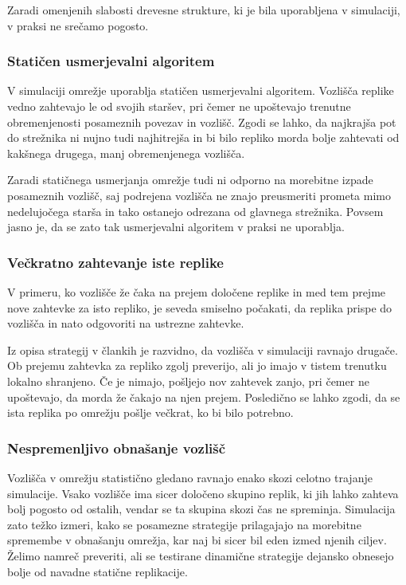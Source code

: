 \documentclass[a4paper, 12pt]{book}
\begin{document}
Zaradi omenjenih slabosti drevesne strukture, ki je bila uporabljena v
simulaciji, v praksi ne srečamo pogosto.

\subsubsection{Statičen usmerjevalni algoritem}

V simulaciji omrežje uporablja statičen usmerjevalni algoritem. Vozlišča
replike vedno zahtevajo le od svojih staršev, pri čemer ne upoštevajo trenutne
obremenjenosti posameznih povezav in vozlišč. Zgodi se lahko, da
najkrajša pot do strežnika ni nujno tudi najhitrejša in bi bilo repliko morda
bolje zahtevati od kakšnega drugega, manj obremenjenega vozlišča.

Zaradi statičnega usmerjanja omrežje tudi ni odporno na morebitne izpade
posameznih vozlišč, saj podrejena vozlišča ne znajo preusmeriti prometa mimo
nedelujočega starša in tako ostanejo odrezana od glavnega strežnika. Povsem
jasno je, da se zato tak usmerjevalni algoritem v praksi ne uporablja.

\subsubsection{Večkratno zahtevanje iste replike}

V primeru, ko vozlišče že čaka na prejem določene replike in med tem prejme
nove zahtevke za isto repliko, je seveda smiselno počakati, da replika prispe
do vozlišča in nato odgovoriti na ustrezne zahtevke.

Iz opisa strategij v člankih je razvidno, da vozlišča v simulaciji ravnajo
drugače. Ob prejemu zahtevka za repliko zgolj preverijo, ali jo imajo v tistem
trenutku lokalno shranjeno. Če je nimajo, pošljejo nov zahtevek zanjo, pri
čemer ne upoštevajo, da morda že čakajo na njen prejem. Posledično se lahko
zgodi, da se ista replika po omrežju pošlje večkrat, ko bi bilo potrebno.

\subsubsection{Nespremenljivo obnašanje vozlišč}

Vozlišča v omrežju statistično gledano ravnajo enako skozi celotno trajanje
simulacije. Vsako vozlišče ima sicer določeno skupino replik, ki jih
lahko zahteva bolj pogosto od ostalih, vendar se ta skupina skozi čas ne
spreminja. Simulacija zato težko izmeri, kako se posamezne strategije
prilagajajo na morebitne spremembe v obnašanju omrežja, kar naj bi sicer bil
eden izmed njenih ciljev. Želimo namreč preveriti, ali se testirane dinamične
strategije dejansko obnesejo bolje od navadne statične replikacije.
\end{document}
